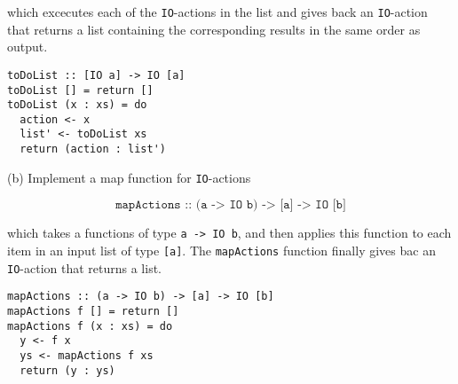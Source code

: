 \documentclass{article}
\begin{document}
    which excecutes each of the \texttt{IO}-actions in the list and gives back an \texttt{IO}-action that returns a list containing the corresponding results in the same order as output.

    \begin{ans}
        \hspace{1em}
        \begin{lstlisting}
toDoList :: [IO a] -> IO [a]
toDoList [] = return []
toDoList (x : xs) = do
  action <- x
  list' <- toDoList xs
  return (action : list')
        \end{lstlisting}
    \end{ans}

    (b) Implement a map function for \texttt{IO}-actions

    \[ \texttt{mapActions :: (a -> IO b) -> [a] -> IO [b]} \]

    which takes a functions of type \texttt{a -> IO b}, and then applies this function to each item in an input list of type \texttt{[a]}. The \texttt{mapActions} function finally gives bac an \texttt{IO}-action that returns a list.

    \begin{ans}
        \hspace{1em}
        \begin{lstlisting}
mapActions :: (a -> IO b) -> [a] -> IO [b]
mapActions f [] = return []
mapActions f (x : xs) = do
  y <- f x
  ys <- mapActions f xs
  return (y : ys)
        \end{lstlisting}
    \end{ans}
\end{document}
